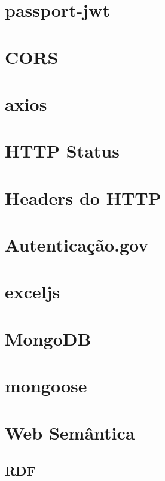 \section{passport-jwt}

\section{CORS}

\section{axios}

\section{HTTP Status}

\section{Headers do HTTP}

\section{Autenticação.gov}
\cite{agov}

\section{exceljs}

\section{MongoDB}
\cite{wdmongo}

\section{mongoose}

\section{Web Semântica}
\cite{lsparql}

\subsection{RDF}
\cite{lsparql}

